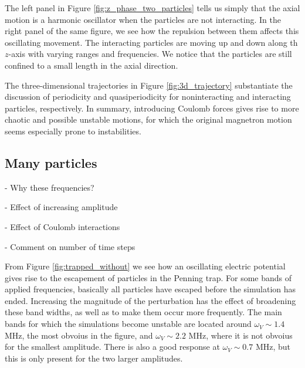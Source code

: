 The left panel in Figure \ref{fig:z_phase_two_particles} tells us simply that the axial motion is a harmonic oscillator  when the particles are not interacting. In the right panel of the same figure, we see how the repulsion between them affects this oscillating movement. The interacting particles are moving up and down along th $z$-axis with varying ranges and frequencies. We notice that the particles are still confined to a small length in the axial direction. 

The three-dimensional trajectories in Figure \ref{fig:3d_trajectory} substantiate the discussion of periodicity and quasiperiodicity for noninteracting and interacting particles, respectively. In summary, introducing Coulomb forces gives rise to more chaotic and possible unstable motions, for which the original magnetron motion seems especially prone to instabilities.





\subsection{Many particles}

\par - Why these frequencies? 
\par - Effect of increasing amplitude 
\par - Effect of Coulomb interactions 
\par - Comment on number of time steps 

From Figure \ref{fig:trapped_without} we see how an oscillating electric potential gives rise to the escapement of particles in the Penning trap. For some bands of applied frequencies, basically all particles have escaped before the simulation has ended. Increasing the magnitude of the perturbation has the effect of broadening these band widths, as well as to make them occur more frequently. The main bands for which the simulations become unstable are located around $\omega_V \sim 1.4$ MHz, the most obvoius in the figure, and $\omega_V \sim 2.2$ MHz, where it is not obvoius for the smallest amplitude. There is also a good response at $\omega_V\sim 0.7$ MHz, but this is only present for the two larger amplitudes.

